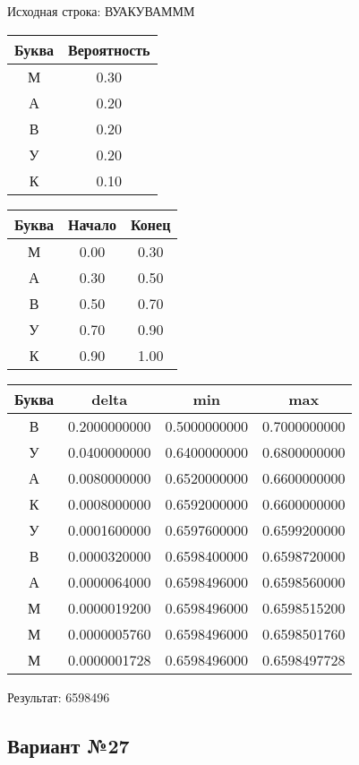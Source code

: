 \documentclass[a4paper, 12pt]{article}
\begin{document}
Исходная строка: ВУАКУВАМММ\
\begin{center}
 \begin{tabular}{ |c|c| } 
  \hline
     Буква & Вероятность \\ \hline
М & 0.30\\\hline
А & 0.20\\\hline
В & 0.20\\\hline
У & 0.20\\\hline
К & 0.10
\\ \hline \end{tabular}
\end{center}
\begin{center}
 \begin{tabular}{ |c|c|c| } 
  \hline
     Буква & Начало & Конец \\ \hline
М & 0.00 & 0.30\\\hline
А & 0.30 & 0.50\\\hline
В & 0.50 & 0.70\\\hline
У & 0.70 & 0.90\\\hline
К & 0.90 & 1.00
\\ \hline \end{tabular}
\end{center}
\begin{center}
 \begin{tabular}{ |c|c|c|c| } 
  \hline
     Буква & delta & min & max \\ \hline
В & 0.2000000000 & 0.5000000000 & 0.7000000000\\\hline
У & 0.0400000000 & 0.6400000000 & 0.6800000000\\\hline
А & 0.0080000000 & 0.6520000000 & 0.6600000000\\\hline
К & 0.0008000000 & 0.6592000000 & 0.6600000000\\\hline
У & 0.0001600000 & 0.6597600000 & 0.6599200000\\\hline
В & 0.0000320000 & 0.6598400000 & 0.6598720000\\\hline
А & 0.0000064000 & 0.6598496000 & 0.6598560000\\\hline
М & 0.0000019200 & 0.6598496000 & 0.6598515200\\\hline
М & 0.0000005760 & 0.6598496000 & 0.6598501760\\\hline
М & 0.0000001728 & 0.6598496000 & 0.6598497728
\\ \hline \end{tabular}
\end{center}
Результат: 6598496
\pagebreak
\subsection{Вариант №27}
\end{document}
